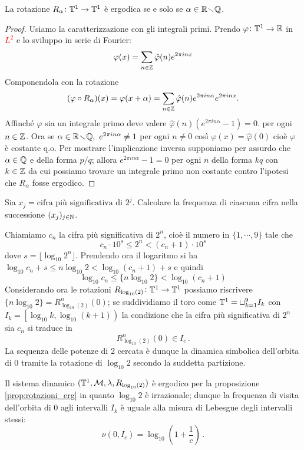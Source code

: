 \begin{proposition}\label{prop:rotazioni_erg}
    La rotazione $ R_\alpha \colon \mathbb{T}^1 \to \mathbb{T}^1 $ è ergodica se e solo se $ \alpha \in \mathbb{R} \!\smallsetminus\! \mathbb{Q} $. 
\end{proposition}
\begin{proof}
    Usiamo la caratterizzazione con gli integrali primi. Prendo $ \varphi \colon \mathbb{T}^1 \to \mathbb{R} $ in \textcolor{red}{$ L^2 $} e lo sviluppo in serie di Fourier:
    \[
    \varphi(x) = \sum_{n \in \mathbb{Z}} \hat{\varphi}(n) e^{2\pi i n x}
    \]
    Componendola con la rotazione
    \[
    (\varphi \circ R_\alpha)(x) = \varphi(x + \alpha) = \sum_{n \in \mathbb{Z}} \hat{\varphi}(n) e^{2\pi i n \alpha} e^{2\pi i n x}.
    \]
    Affinché $ \varphi $ sia un integrale primo deve valere $ \hat{\varphi}(n) \left(e^{2\pi i n \alpha} - 1 \right) = 0. $ per ogni $ n \in \mathbb{Z} $.
    Ora se $ \alpha \in \mathbb{R} \!\smallsetminus\! \mathbb{Q}, \ e^{2\pi i n \alpha} \neq 1 $ per ogni $ n \neq 0 $ così $ \varphi(x) = \hat{\varphi}(0) $ cioè $ \varphi $ è costante q.o. Per mostrare l'implicazione inversa supponiamo per assurdo che $ \alpha \in \mathbb{Q} $ e della forma $ p/q $; allora $ e^{2\pi i n \alpha} - 1 = 0 $ per ogni $ n $ della forma $ kq $ con $ k \in \mathbb{Z} $ da cui possiamo trovare un integrale primo non costante contro l'ipotesi che $ R_\alpha $ fosse ergodico.
\end{proof}

\begin{exercise}\label{ex:potenze_di_due_cancro}
    Sia $ x_j = \text{cifra più significativa di } 2^j $. Calcolare la frequenza di ciascuna cifra nella successione $ (x_j)_{j\in\mathbb{N}} $.
\end{exercise}
\begin{solution}
    Chiamiamo $ c_n $ la cifra più significativa di $ 2^n $, cioè il numero in $ \{1, \cdots, 9\} $ tale che
    \[ c_n \cdot 10^s \leq 2^n < (c_n+1) \cdot 10^s \]
    dove $ s = \lfloor \log_{10} 2^n \rfloor $. Prendendo ora il logaritmo si ha $ \log_{10}c_n + s \leq n\log_{10}2 < \log_{10}(c_n+1) + s $ e quindi
    \[ \log_{10}c_n \leq \{n\log_{10}2\} < \log_{10}(c_n+1) \]
    Considerando ora le rotazioni $ R_{\log_{10}(2)} \colon \mathbb{T}^1\to\mathbb{T}^1 $ possiamo riscrivere $ \{ n\log_{10}2 \} = R^n_{\log_{10}(2)}(0) $;
    se suddividiamo il toro come $ \mathbb{T}^1 = \sqcup_{k=1}^9 I_k $ con $ I_k = \left[\log_{10}k,\log_{10}(k+1)\right) $ la condizione che la cifra più significativa di $ 2^n $ sia $ c_n $ si traduce in
    \[ R^n_{\log_{10}(2)}(0) \in I_c \, . \]
    La sequenza delle potenze di 2 cercata è dunque la dinamica simbolica dell'orbita di 0 tramite la rotazione di $ \log_{10}2 $ secondo la suddetta partizione.
    
    Il sistema dinamico $ (\mathbb{T}^1, \mathcal{M}, \lambda, R_{\log_{10}(2)}) $ è ergodico per la proposizione \ref{prop:rotazioni_erg} in quanto $ \log_{10}2 $ è irrazionale; dunque la frequenza di visita dell'orbita di 0 agli intervalli $ I_k $ è uguale alla misura di Lebesgue degli intervalli stessi:
    \[ \nu(0,I_c) = \log_{10}\left(1+\frac{1}{c}\right) \, . \]
\end{solution}

